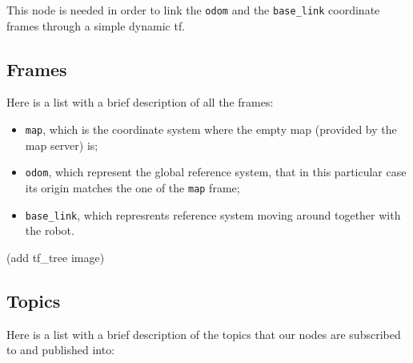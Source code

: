 \documentclass[11pt,a4paper]{article}
\begin{document}
This node is needed in order to link the \texttt{odom} and the \texttt{base\_link} coordinate frames through a simple dynamic tf.

\subsection{Frames}

Here is a list with a brief description of all the frames:
\begin{itemize}
 \item \texttt{map}, which is the coordinate system where the empty map (provided by the map server) is;
 \item \texttt{odom}, which represent the global reference system, that in this particular case its origin matches the one of the \texttt{map} frame;
 \item \texttt{base\_link}, which represrents reference system moving around together with the robot.
\end{itemize}

(add tf\_tree image)

\subsection{Topics}

Here is a list with a brief description of the topics that our nodes are subscribed to and published into:\\
\end{document}
